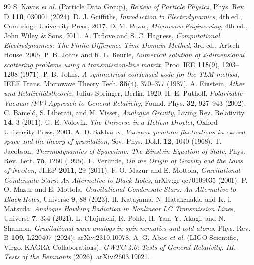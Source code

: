 \documentclass[11pt,a4paper]{article}
\theoremstyle{plain}
\theoremstyle{remark}
\begin{document}
\begin{thebibliography}{99}
 S. Navas \textit{et al.} (Particle Data Group), \textit{Review of Particle Physics}, Phys. Rev. D \textbf{110}, 030001 (2024).
 D. J. Griffiths, \textit{Introduction to Electrodynamics}, 4th ed., Cambridge University Press, 2017.
 D. M. Pozar, \textit{Microwave Engineering}, 4th ed., John Wiley \& Sons, 2011.
 A. Taflove and S. C. Hagness, \textit{Computational Electrodynamics: The Finite-Difference Time-Domain Method}, 3rd ed., Artech House, 2005.
 P. B. Johns and R. L. Beurle, \textit{Numerical solution of 2-dimensional scattering problems using a transmission-line matrix}, Proc. IEE \textbf{118}(9), 1203--1208 (1971).
 P. B. Johns, \textit{A symmetrical condensed node for the TLM method}, IEEE Trans. Microwave Theory Tech. \textbf{35}(4), 370--377 (1987).
 A. Einstein, \textit{\"Ather und Relativit\"atstheorie}, Julius Springer, Berlin, 1920.
 H. E. Puthoff, \textit{Polarizable-Vacuum (PV) Approach to General Relativity}, Found. Phys. \textbf{32}, 927--943 (2002).
 C. Barcel\'o, S. Liberati, and M. Visser, \textit{Analogue Gravity}, Living Rev. Relativity \textbf{14}, 3 (2011).
 G. E. Volovik, \textit{The Universe in a Helium Droplet}, Oxford University Press, 2003.
 A. D. Sakharov, \textit{Vacuum quantum fluctuations in curved space and the theory of gravitation}, Sov. Phys. Dokl. \textbf{12}, 1040 (1968).
 T. Jacobson, \textit{Thermodynamics of Spacetime: The Einstein Equation of State}, Phys. Rev. Lett. \textbf{75}, 1260 (1995).
 E. Verlinde, \textit{On the Origin of Gravity and the Laws of Newton}, JHEP \textbf{2011}, 29 (2011).
 P. O. Mazur and E. Mottola, \textit{Gravitational Condensate Stars: An Alternative to Black Holes}, arXiv:gr-qc/0109035 (2001).
 P. O. Mazur and E. Mottola, \textit{Gravitational Condensate Stars: An Alternative to Black Holes}, Universe \textbf{9}, 88 (2023).
 H. Katayama, N. Hatakenaka, and K.-i. Matsuda, \textit{Analogue Hawking Radiation in Nonlinear LC Transmission Lines}, Universe \textbf{7}, 334 (2021).
 L. Chojnacki, R. Pohle, H. Yan, Y. Akagi, and N. Shannon, \textit{Gravitational wave analogs in spin nematics and cold atoms}, Phys. Rev. B \textbf{109}, L220407 (2024); arXiv:2310.10078.
 A. G. Abac \textit{et al.} (LIGO Scientific, Virgo, KAGRA Collaborations), \textit{GWTC-4.0: Tests of General Relativity. III. Tests of the Remnants} (2026). arXiv:2603.19021.

\end{thebibliography}
\end{document}
